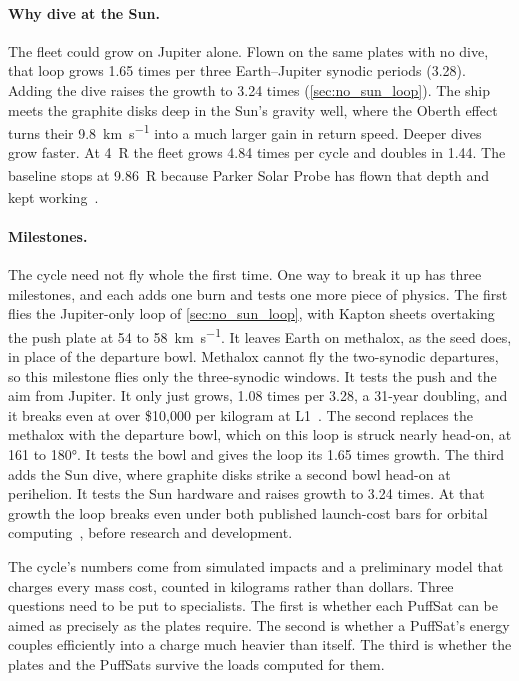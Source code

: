 \documentclass{article}
\begin{document}
\paragraph{Why dive at the Sun.} The fleet could grow on Jupiter alone. Flown on the same plates with no dive, that loop grows 1.65 times per three Earth--Jupiter synodic periods (\SI{3.28}{\year}). Adding the dive raises the growth to 3.24 times (\autoref{sec:no_sun_loop}). The ship meets the graphite disks deep in the Sun's gravity well, where the Oberth effect turns their \SI{9.8}{\kilo\meter\per\second} into a much larger gain in return speed. Deeper dives grow faster. At \SI{4}{R_\odot} the fleet grows 4.84 times per cycle and doubles in \SI{1.44}{\year}. The baseline stops at \SI{9.86}{R_\odot} because Parker Solar Probe has flown that depth and kept working~\cite{nasa2024_parker_survives}.

\paragraph{Milestones.} The cycle need not fly whole the first time. One way to break it up has three milestones, and each adds one burn and tests one more piece of physics. The first flies the Jupiter-only loop of \autoref{sec:no_sun_loop}, with Kapton sheets overtaking the push plate at 54 to \SI{58}{\kilo\meter\per\second}. It leaves Earth on methalox, as the seed does, in place of the departure bowl. Methalox cannot fly the two-synodic departures, so this milestone flies only the three-synodic windows. It tests the push and the aim from Jupiter. It only just grows, 1.08 times per \SI{3.28}{\year}, a 31-year doubling, and it breaks even at over \$10{,}000 per kilogram at L1~\cite{katz2026aim}. The second replaces the methalox with the departure bowl, which on this loop is struck nearly head-on, at 161 to \ang{180}. It tests the bowl and gives the loop its 1.65 times growth. The third adds the Sun dive, where graphite disks strike a second bowl head-on at perihelion. It tests the Sun hardware and raises growth to 3.24 times. At that growth the loop breaks even under both published launch-cost bars for orbital computing~\cite{aguera2026_suncatcher,bennici2026_johnston}, before research and development.

The cycle's numbers come from simulated impacts and a preliminary model that charges every mass cost, counted in kilograms rather than dollars. Three questions need to be put to specialists. The first is whether each PuffSat can be aimed as precisely as the plates require. The second is whether a PuffSat's energy couples efficiently into a charge much heavier than itself. The third is whether the plates and the PuffSats survive the loads computed for them.
\end{document}
